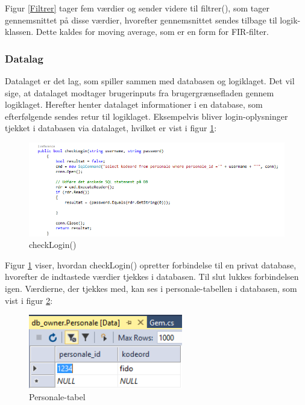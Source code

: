 Figur \ref{Filtrer} tager fem værdier og sender videre til filtrer(), som tager gennemsnittet på disse værdier, hvorefter gennemsnittet sendes tilbage til logik-klassen.
Dette kaldes for moving average, som er en form for FIR-filter.

\subsubsection{Datalag}\label{Datalag}
Datalaget er det lag, som spiller sammen med databasen og logiklaget. Det vil sige, at datalaget modtager brugerinputs fra brugergrænsefladen gennem logiklaget. Herefter henter datalaget informationer i en database, som efterfølgende sendes retur til logiklaget. Eksempelvis bliver login-oplysninger tjekket i databasen via datalaget, hvilket er vist i figur \ref{Datalogin}:

\begin{figure}[H]
	\centering
	\includegraphics[width=1.4\textwidth]{Figurer/SoftwareImplementering/CheckLogind}
	\caption{checkLogin()}
	\label{Datalogin}
\end{figure}

Figur \ref{Datalogin} viser, hvordan checkLogin() opretter forbindelse til en privat database, hvorefter de indtastede værdier tjekkes i databasen. Til slut lukkes forbindelsen igen. Værdierne, der tjekkes med, kan ses i personale-tabellen i databasen, som vist i figur \ref{personaletabel}:

\begin{figure}[H]
	\centering
	\includegraphics[width=0.6\textwidth]{Figurer/SoftwareImplementering/database}
	\caption{Personale-tabel}
	\label{personaletabel}
\end{figure}

